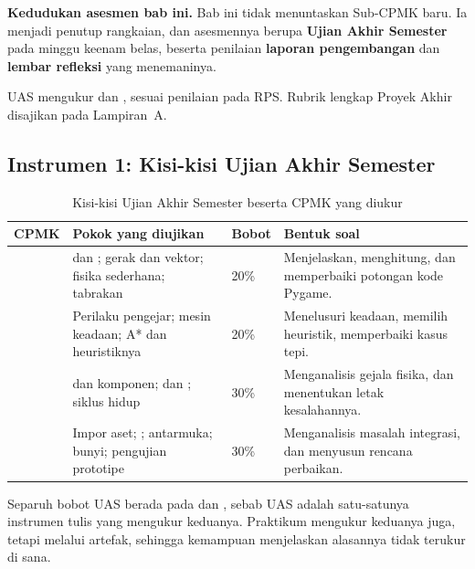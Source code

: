 \label{sec:asesmen-akhir}

\begin{asesmenbox}
\textbf{Kedudukan asesmen bab ini.} Bab ini tidak menuntaskan Sub-CPMK baru.
Ia menjadi penutup rangkaian, dan asesmennya berupa \textbf{Ujian Akhir
Semester} pada minggu keenam belas, beserta penilaian \textbf{laporan
pengembangan} dan \textbf{lembar refleksi} yang menemaninya.

\vspace{0.4em}
UAS mengukur  dan , sesuai penilaian pada RPS. Rubrik lengkap
Proyek Akhir disajikan pada Lampiran~A.
\end{asesmenbox}

\subsection*{Instrumen 1: Kisi-kisi Ujian Akhir Semester}

\begin{table}[htbp]
\centering
\caption{Kisi-kisi Ujian Akhir Semester beserta CPMK yang diukur}
\label{tab:kisi-uas}
{\setlength{\tabcolsep}{4pt}\footnotesize%
\begin{tabularx}{\textwidth}{@{}C{1.7cm} L{4.4cm} C{1.8cm} Y@{}}
\toprule
\headrow \textbf{CPMK} & \textbf{Pokok yang diujikan} & \textbf{Bobot} & \textbf{Bentuk soal} \\
\midrule
{} &  dan ; gerak dan vektor;
fisika sederhana; tabrakan &
20\% & Menjelaskan, menghitung, dan memperbaiki potongan kode Pygame. \\
\addlinespace
{} & Perilaku pengejar; mesin keadaan; A* dan heuristiknya &
20\% & Menelusuri keadaan, memilih heuristik, memperbaiki kasus tepi. \\
\addlinespace
{} &  dan komponen;  dan
; siklus hidup  &
30\% & Menganalisis gejala fisika, dan menentukan letak kesalahannya. \\
\addlinespace
{} & Impor aset; ; antarmuka; bunyi; pengujian
prototipe &
30\% & Menganalisis masalah integrasi, dan menyusun rencana perbaikan. \\
\bottomrule
\end{tabularx}}
\end{table}

Separuh bobot UAS berada pada  dan , sebab
UAS adalah satu-satunya instrumen tulis yang mengukur keduanya. Praktikum
mengukur keduanya juga, tetapi melalui artefak, sehingga kemampuan
menjelaskan alasannya tidak terukur di sana.


